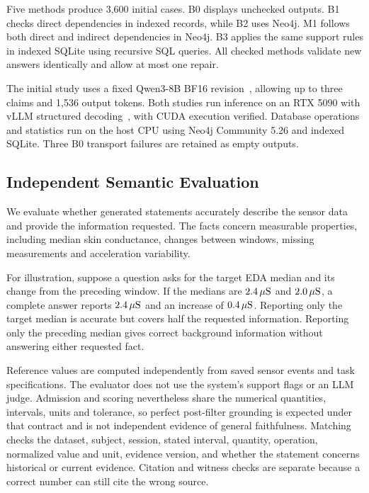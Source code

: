 \documentclass[runningheads]{llncs}
\begin{document}
Five methods produce 3,600 initial cases. B0 displays unchecked outputs.
B1 checks direct dependencies in indexed records, while B2 uses Neo4j.
M1 follows both direct and indirect dependencies in Neo4j. B3 applies the
same support rules in indexed SQLite using recursive SQL queries.
All checked methods validate new answers identically and allow at most
one repair.

The initial study uses a fixed Qwen3-8B BF16 revision~\cite{qwen3}, allowing
up to three claims and 1,536 output tokens. Both studies run inference on an
RTX 5090 with vLLM structured decoding~\cite{vllm}, with CUDA execution
verified. Database operations and statistics run on the host CPU using
Neo4j Community 5.26 and indexed SQLite. Three B0 transport failures are
retained as empty outputs.



\subsection{Independent Semantic Evaluation}

We evaluate whether generated statements accurately describe the sensor data
and provide the information requested. The facts concern measurable properties,
including median skin conductance, changes between windows, missing measurements
and acceleration variability.

For illustration, suppose a question asks for the target EDA median and its
change from the preceding window. If the medians are $2.4\,\mu{\rm S}$ and
$2.0\,\mu{\rm S}$, a complete answer reports $2.4\,\mu{\rm S}$ and an increase
of $0.4\,\mu{\rm S}$. Reporting only the target median is accurate but covers
half the requested information. Reporting only the preceding median gives
correct background information without answering either requested fact.

Reference values are computed independently from saved sensor events and task
specifications. The evaluator does not use the system's support flags or an
LLM judge. Admission and scoring nevertheless share the numerical quantities,
intervals, units and tolerance, so perfect post-filter grounding is expected
under that contract and is not independent evidence of general faithfulness.
Matching checks the dataset, subject, session, stated interval,
quantity, operation, normalized value and unit, evidence version, and whether
the statement concerns historical or current evidence. Citation and witness
checks are separate because a correct number can still cite the wrong source.
\end{document}

